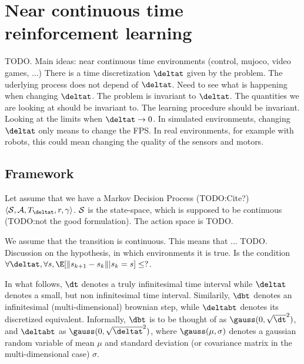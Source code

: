 \section{Near continuous time reinforcement learning}
\label{sec:framework}
TODO. Main ideas: near continuous time environments (control, mujoco, video games, ...)
There is a time discretization $\deltat$ given by the problem. The uderlying process does not depend of $\deltat$. Need to see what is happening when changing $\deltat$. The problem is invariant to $\deltat$. The quantities we are looking at should be invariant to. The learning procedure should be invariant. Looking at the limits when $\deltat \rightarrow 0$. In simulated environments, changing $\deltat$ only means to change the FPS. In real environments, for example with robots, this could mean changing the quality of the sensors and motors.

\subsection{Framework}

Let assume that we have a Markov Decision Process (TODO:Cite?) $\langle {\cal S}, {\cal A}, T_{\deltat}, r, \gamma\rangle$. ${\cal S}$ is the state-space, which is supposed to be continuous (TODO:not the good formulation). The action space is TODO.

We assume that the transition is continuous. This means that ... TODO. Discussion on the hypothesis, in which environments it is true. Is the condition $\forall \deltat, \forall s, \E[\|s_{k+1} - s_k \||s_k = s] \leq ?$. 

In what follows, $\dt$ denotes a truly infinitesimal time interval while $\deltat$
denotes a small, but non infinitesimal time interval. Similarily, $\dbt$ denotes
an infinitesimal (multi-dimensional) brownian step, while $\deltabt$ denotes its
discretized equivalent. Informally, $\dbt$ is to be thought of as $\gauss(0, \sqrt{\dt}^2)$,
and $\deltabt$ as $\gauss(0, \sqrt{\deltat}^2)$, where $\gauss(\mu, \sigma)$ denotes a gaussian
random variable of mean $\mu$ and standard deviation (or covariance matrix in the multi-dimensional case)
$\sigma$.

